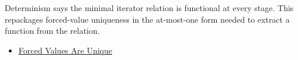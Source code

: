 \begin{remark*}[Interpretation]
Determinism says the minimal iterator relation is functional at every stage.
This repackages forced-value uniqueness in the at-most-one form needed to
extract a function from the relation.
\end{remark*}

\begin{dependencies}
\begin{itemize}
  \item \hyperref[lem:forced-values-are-unique]{Forced Values Are Unique}
\end{itemize}
\end{dependencies}

